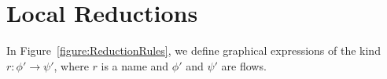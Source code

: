 

\chapter{Local Reductions}

\begin{definition}\label{definition:FlowGraphicalExpressions}
In Figure~\vref{figure:ReductionRules}, we define graphical expressions of the kind $r\colon\phi'\to\psi'$, where $r$ is a name and $\phi'$ and $\psi'$ are flows.
\end{definition}


